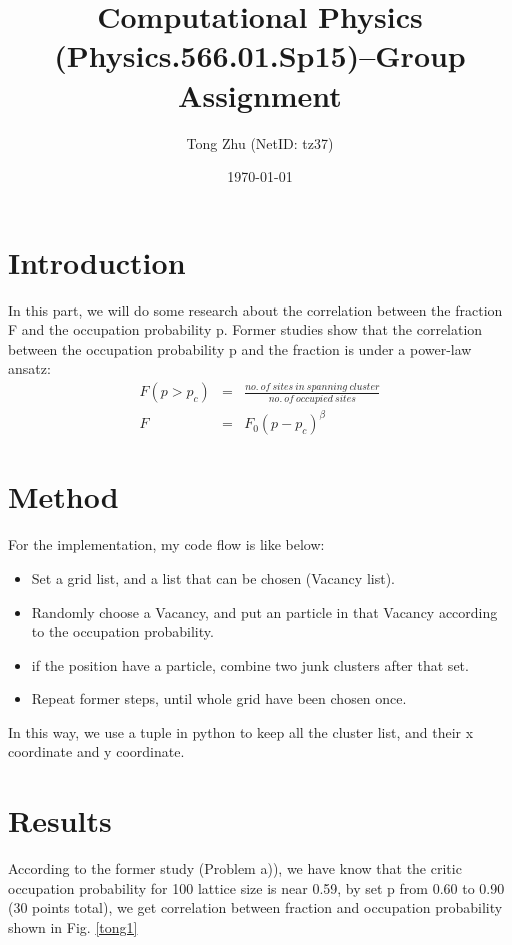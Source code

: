 \documentclass[print,onecolumn]{revtex4-1}
\begin{document}
\title{Computational Physics (Physics.566.01.Sp15)--Group Assignment}
\author{Tong Zhu (NetID: tz37)}
\date{\today}
\maketitle

\section{Introduction}
In this part, we will do some research about the correlation between the fraction F and the occupation probability p. Former studies show that the correlation between the occupation probability p and the fraction is under a power-law ansatz: 
\begin{eqnarray}
F(p>p_c)& = & \frac{no.\  of\  sites \ in\  spanning\  cluster}{no. \ of \ occupied \ sites} \nonumber \\
F&=&F_0(p-p_c)^\beta
\end{eqnarray}


\section{Method}


For the implementation, my code flow is like below:
\begin{itemize}
\item Set a grid list, and a list that can be chosen (Vacancy list). 
\item Randomly choose a Vacancy, and put an particle in that Vacancy according to the occupation probability. 
\item if the position have a particle, combine two junk clusters after that set.
\item  Repeat former steps, until whole grid have been chosen once. 
\end{itemize}

In this way, we use a tuple in python to keep all the cluster list, and their x coordinate and y coordinate. 


\section{Results}

According to the former study (Problem a)), we have know that the critic occupation probability for 100 lattice size is near 0.59, by set p from 0.60 to 0.90 (30 points total), we get correlation between  fraction and occupation probability shown in Fig. \ref{tong1}
\end{document}
